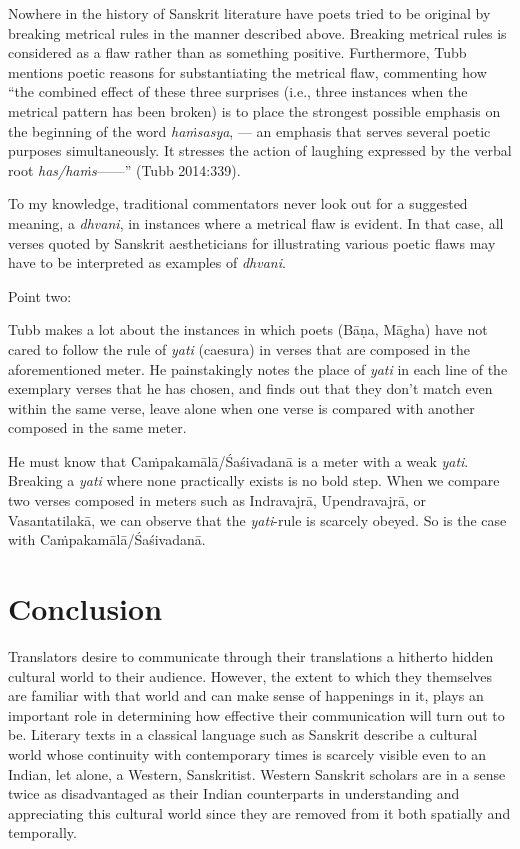 Nowhere in the history of Sanskrit literature have poets tried to be original by breaking metrical rules in the manner described above. Breaking metrical rules is considered as a flaw rather than as something positive. Furthermore, Tubb mentions poetic reasons for substantiating the metrical flaw, commenting how “the combined effect of these three surprises (i.e., three instances when the metrical pattern has been broken) is to place the strongest possible emphasis on the beginning of the word \textsl{haṁsasya}, --- an emphasis that serves several poetic purposes simultaneously. It stresses the action of laughing expressed by the verbal root \textsl{has/haṁs}—---” (Tubb 2014:339). 

To my knowledge, traditional commentators never look out for a suggested meaning, a \textsl{dhvani}, in instances where a metrical flaw is evident. In that case, all verses quoted by Sanskrit aestheticians for illustrating various poetic flaws may have to be interpreted as examples of \textsl{dhvani}.

Point two:

Tubb makes a lot about the instances in which poets (Bāṇa, Māgha) have not cared to follow the rule of \textsl{yati} (caesura) in verses that are composed in the aforementioned meter. He painstakingly notes the place of \textsl{yati} in each line of the exemplary verses that he has chosen, and finds out that they don’t match even within the same verse, leave alone when one verse is compared with another composed in the same meter. 

He must know that Caṁpakamālā/Śaśivadanā is a meter with a weak \textsl{yati}. Breaking a \textsl{yati} where none practically exists is no bold step. When we compare two verses composed in meters such as Indravajrā, Upendravajrā, or Vasantatilakā, we can observe that the \textsl{yati}-rule is scarcely obeyed. So is the case with Caṁpakamālā/Śaśivadanā.

\section*{Conclusion}

Translators desire to communicate through their translations a hitherto hidden cultural world to their audience. However, the extent to which they themselves are familiar with that world and can make sense of happenings in it, plays an important role in determining how effective their communication will turn out to be. Literary texts in a classical language such as Sanskrit describe a cultural world whose continuity with contemporary times is scarcely visible even to an Indian, let alone, a Western, Sanskritist. Western Sanskrit scholars are in a sense twice as disadvantaged as their Indian counterparts in understanding and appreciating this cultural world since they are removed from it both spatially and temporally. 


